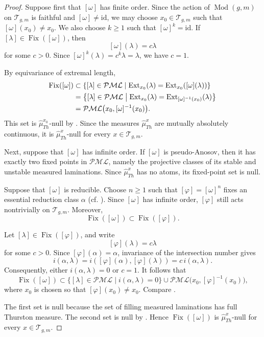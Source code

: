 \documentclass[dvipdfmx]{amsart}
\theoremstyle{remark}
\newcommand{\ext}{{\rm Ext}}
\newcommand{\teich}{\mathcal{T}}
\newcommand{\tmod}{\operatorname{Mod}}
\newcommand{\PThursM}{\hat{\mu}_{Th}}
\newcommand{\pml}{\mathcal{PML}}
\begin{document}
\begin{proof}
Suppose first that $[\omega]$ has finite order. Since the action of $\tmod(g,m)$ on $\teich_{g,m}$ is faithful and $[\omega]\ne\mathrm{id}$, we may choose $x_0\in\teich_{g,m}$ such that $[\omega](x_0)\ne x_0$.
We also choose $k\ge1$ such that $[\omega]^k=\mathrm{id}$. If $[\lambda]\in\operatorname{Fix}([\omega])$, then
\[
[\omega](\lambda)=c\lambda
\]
for some $c>0$. Since $[\omega]^k(\lambda)=c^k\lambda=\lambda$, we have
$c=1$.

By equivariance of extremal length,
\begin{align*}
\operatorname{Fix}([\omega])
&\subset
\left\{
[\lambda]\in\pml\mathrel{}\middle|\mathrel{}
\ext_{x_0}(\lambda)
=
\ext_{x_0}([\omega](\lambda))
\right\} \\
&=
\left\{
[\lambda]\in\pml\mathrel{}\middle|\mathrel{}
\ext_{x_0}(\lambda)
=
\ext_{[\omega]^{-1}(x_0)}(\lambda)
\right\} \\
&=
\pml\bigl(x_0,[\omega]^{-1}(x_0)\bigr).
\end{align*}
This set is $\PThursM^{x_0}$-null by . Since the
measures $\PThursM^x$ are mutually absolutely continuous, it is
$\PThursM^x$-null for every $x\in\teich_{g,m}$.

Next, suppose that $[\omega]$ has infinite order. If $[\omega]$ is
pseudo-Anosov, then it has exactly two fixed points in $\pml$, namely
the projective classes of its stable and unstable measured laminations.
Since $\PThursM^x$ has no atoms, its fixed-point set is null.

Suppose that $[\omega]$ is reducible. Choose $n\ge1$ such that
$[\varphi]=[\omega]^n$ fixes an essential reduction class $\alpha$ (cf. \cite[\S2]{BirmanLubotzkyMcCarthy1983}).
Since $[\omega]$ has infinite order, $[\varphi]$ still acts nontrivially
on $\teich_{g,m}$. Moreover,
\[
\operatorname{Fix}([\omega])
\subset \operatorname{Fix}([\varphi]).
\]

Let $[\lambda]\in\operatorname{Fix}([\varphi])$, and write
\[
[\varphi](\lambda)=c\lambda
\]
for some $c>0$. Since $[\varphi](\alpha)=\alpha$, invariance of the
intersection number gives
\[
i(\alpha,\lambda)
=
i([\varphi](\alpha),[\varphi](\lambda))
=
c\,i(\alpha,\lambda).
\]
Consequently, either $i(\alpha,\lambda)=0$ or $c=1$. It follows that
\[
\operatorname{Fix}([\omega])
\subset
\{[\lambda]\in\pml\mid i(\alpha,\lambda)=0\}
\cup
\pml\bigl(x_0,[\varphi]^{-1}(x_0)\bigr),
\]
where $x_0$ is chosen so that $[\varphi](x_0)\ne x_0$. Compare \cite[Corollary~2.17]{Ivanov1992}.

The first set is null because the set of filling measured laminations
has full Thurston measure. The second set is null by
. Hence $\operatorname{Fix}([\omega])$ is
$\PThursM^x$-null for every $x\in\teich_{g,m}$.
\end{proof}
\end{document}
